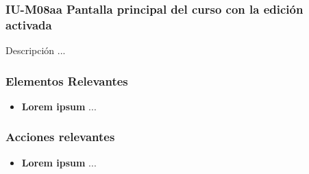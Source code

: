 
\subsubsection{IU-M08aa Pantalla principal del curso con la edición activada}

 Descripción ...


\subsubsection{Elementos Relevantes}

    \begin{itemize}
    \item {\bf Lorem ipsum}
        ...
    \end{itemize}

\subsubsection{Acciones relevantes}

    \begin{itemize}
    \item {\bf Lorem ipsum}
        ...
    \end{itemize}

\clearpage
